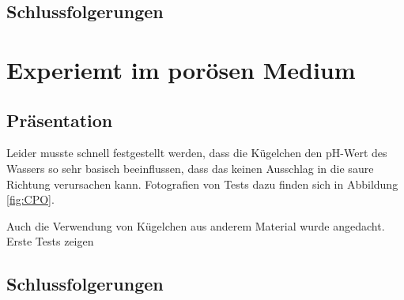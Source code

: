 
\subsection{Schlussfolgerungen}
\label{res:cot:disk}

\section{\COT Experiemt im porösen Medium}
\label{res:cpm}

\subsection{Präsentation}
\label{res:cpm:pres}
Leider musste schnell festgestellt werden, dass die Kügelchen den pH-Wert des Wassers so sehr basisch beeinflussen, dass das \COT keinen Ausschlag in die saure Richtung verursachen kann. Fotografien von Tests dazu finden sich in Abbildung \ref{fig:CPO}.


Auch die Verwendung von Kügelchen aus anderem Material wurde angedacht. Erste Tests zeigen

\subsection{Schlussfolgerungen}
\label{res:cpm:disk}

